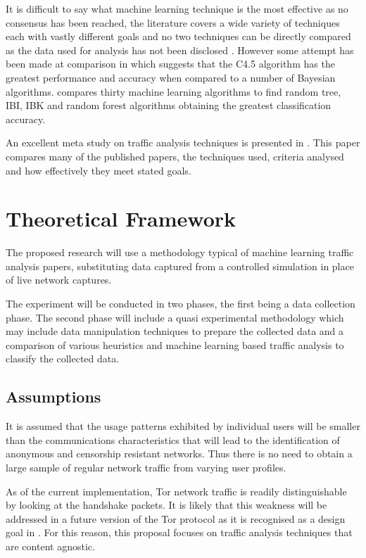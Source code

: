 \documentclass{ecuthesis}
\begin{document}
It is difficult to say what machine learning technique is the most effective as
no consensus has been reached, the literature covers a wide variety of
techniques each with vastly different goals and no two techniques can be
directly compared as the data used for analysis has not been disclosed
\parencite{Kim:2007p3867}. However some attempt has been made at comparison in
\textcite{Williams:2006p3849} which suggests that the C4.5 algorithm has the
greatest performance and accuracy when compared to a number of Bayesian
algorithms. \textcite{Mohd:2009p6484} compares thirty machine learning
algorithms  to find random tree, IBI, IBK and random forest algorithms
obtaining the greatest classification accuracy.

An excellent meta study on traffic analysis techniques is presented in
\textcite{Nguyen:2008p3837}. This paper compares many of the published papers,
the techniques used, criteria analysed and how effectively they meet stated
goals.

\chapter{Theoretical Framework}

The proposed research will use a methodology typical of machine learning
traffic analysis papers, substituting data captured from a controlled
simulation in place of live network captures.

The experiment will be conducted in two phases, the first being a data
collection phase. The second phase will include a quasi experimental
methodology which may include data manipulation techniques to prepare the
collected data and a comparison of various heuristics and machine learning
based traffic analysis to classify the collected data.

\section{Assumptions}

It is assumed that the usage patterns exhibited by individual users will be
smaller than the communications characteristics that will lead to the
identification of anonymous and censorship resistant networks. Thus there is no
need to obtain a large sample of regular network traffic from varying user
profiles.

As of the current implementation, Tor network traffic is readily
distinguishable by looking at the handshake packets. It is likely that this
weakness will be addressed in a future version of the Tor protocol as it is
recognised as a design goal in \textcite{Dingledine:2008p1542}. For this
reason, this proposal focuses on traffic analysis techniques that are content
agnostic.
\end{document}
